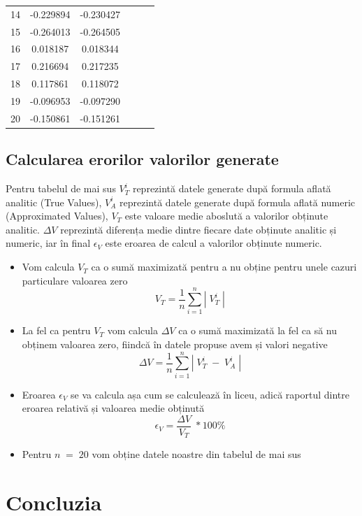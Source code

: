 \documentclass[12pt, a4paper]{article}
\begin{document}
\begin{samepage}
\begin{center}
\begin{tabular}{| l | c | c | c | c | c |}
         14 & -0.229894 & -0.230427 & & &\\
         \cline{1-3}
         15 & -0.264013 & -0.264505 & & &\\
         \cline{1-3}
         16 & 0.018187 & 0.018344 & & &\\
         \cline{1-3}
         17 & 0.216694 & 0.217235 & & &\\
         \cline{1-3}
         18 & 0.117861 & 0.118072 & & &\\
         \cline{1-3}
         19 & -0.096953 & -0.097290 & & &\\
         \cline{1-3}
         20 & -0.150861 & -0.151261 & & &\\
         \hline
    \end{tabular}
\end{center}
\end{samepage}
\newpage
\subsection{Calcularea erorilor valorilor generate}
\hspace{0.4cm}Pentru tabelul de mai sus $V^{i}_T$ reprezintă datele generate după formula aflată analitic (True Values), $V^{i}_A$ reprezintă datele generate după formula aflată numeric (Approximated Values), $V_T$ este valoare medie aboslută a valorilor obținute analitic. $\Delta V$ reprezintă diferența medie dintre fiecare date obținute analitic și numeric, iar în final $\epsilon_V$ este eroarea de calcul a valorilor obținute numeric.

\begin{itemize}
    \item Vom calcula $V_T$ ca o sumă maximizată pentru a nu obține pentru unele cazuri particulare valoarea zero
    $$V_T = \frac{1}{n}\sum_{i=1}^{n} |\;V^{i}_T\;|$$
    \item La fel ca pentru $V_T$ vom calcula $\Delta V$ ca o sumă maximizată la fel ca să nu obținem valoarea zero, fiindcă în datele propuse avem și valori negative
    $$\Delta V = \frac{1}{n}\sum_{i=1}^{n}|\;V_{T}^{i}\;-\;V_{A}^{i}\;|$$
    \item Eroarea $\epsilon_V$ se va calcula așa cum se calculează în liceu, adică raportul dintre eroarea relativă și valoarea medie obținută
    $$\epsilon_V = \frac{\Delta V}{V_T}\;*100\%$$
    \item Pentru $n\;=\;20$ vom obține datele noastre din tabelul de mai sus
\end{itemize}
\section{Concluzia}
\end{document}
